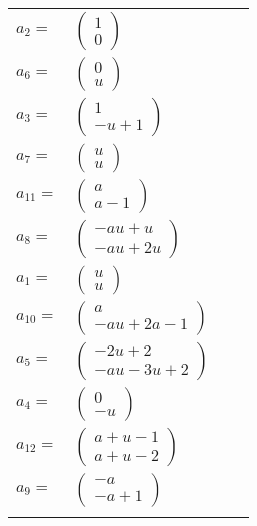 \documentclass[1p]{elsarticle_modified}
\theoremstyle{definition}
\begin{document}
\begin{tabular}{m{7pt} m{180pt} m{7pt} m{180pt} }
\flushright $a_{2}=$&$\begin{pmatrix}1\\0\end{pmatrix}$ \\
\flushright $a_{6}=$&$\begin{pmatrix}0\\u\end{pmatrix}$ \\
\flushright $a_{3}=$&$\begin{pmatrix}1\\- u+1\end{pmatrix}$ \\
\flushright $a_{7}=$&$\begin{pmatrix}u\\u\end{pmatrix}$ \\
\flushright $a_{11}=$&$\begin{pmatrix}a\\a-1\end{pmatrix}$ \\
\flushright $a_{8}=$&$\begin{pmatrix}- a u+u\\- a u+2 u\end{pmatrix}$ \\
\flushright $a_{1}=$&$\begin{pmatrix}u\\u\end{pmatrix}$ \\
\flushright $a_{10}=$&$\begin{pmatrix}a\\- a u+2 a-1\end{pmatrix}$ \\
\flushright $a_{5}=$&$\begin{pmatrix}-2 u+2\\- a u-3 u+2\end{pmatrix}$ \\
\flushright $a_{4}=$&$\begin{pmatrix}0\\- u\end{pmatrix}$ \\
\flushright $a_{12}=$&$\begin{pmatrix}a+u-1\\a+u-2\end{pmatrix}$ \\
\flushright $a_{9}=$&$\begin{pmatrix}- a\\- a+1\end{pmatrix}$\\&\end{tabular}
\end{document}
